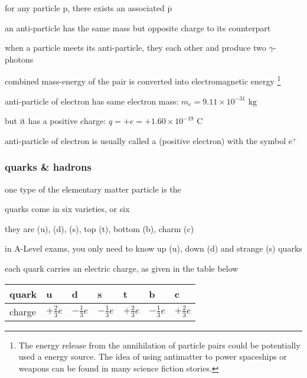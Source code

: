 for any particle $\text{p}$, there exists an associated  $\bar{\text{p}}$

\cmt an anti-particle has the same mass but opposite charge to its counterpart

\cmt when a particle meets its anti-particle, they  each other and produce two $\gamma$-photons

combined mass-energy of the pair is converted into electromagnetic energy
\footnote{The energy release from the annihilation of  particle pairs could be potentially used a energy source. The idea of using antimatter to power spaceships or weapons can be found in many science fiction stories.}




\sol anti-particle of electron has same electron mass: $m_e = 9.11\times10^{-31} \text{ kg}$

but it has a positive charge: $q = +e = + 1.60\times10^{-19} \text{ C}$

anti-particle of electron is usually called a  (positive electron) with the symbol $\text{e}^+$ \eoe


\subsubsection{quarks \& hadrons}

one type of the elementary matter particle is the 

\cmt quarks come in six varieties, or six 

they are  (u),  (d),  (s), top (t), bottom (b), charm (c)

in A-Level exams, you only need to know up (u), down (d) and strange (s) quarks

\cmt each quark carries an electric charge, as given in the table below

\begin{center}
	{\renewcommand{\arraystretch}{1.35}
		\begin{tabular}{|C{1.5cm}|C{1.25cm}|C{1.25cm}|C{1.25cm}|C{1.25cm}|C{1.25cm}|C{1.25cm}|}
			\hline quark & u & d & s & t & b & c \\
			\hline charge & $+\frac{2}{3}e$ & $-\frac{1}{3}e$ & $-\frac{1}{3}e$ & $+\frac{2}{3}e$ & $-\frac{1}{3}e$ & $+\frac{2}{3}e$ \\[3pt]
			\hline
		\end{tabular}
	}
\end{center}

